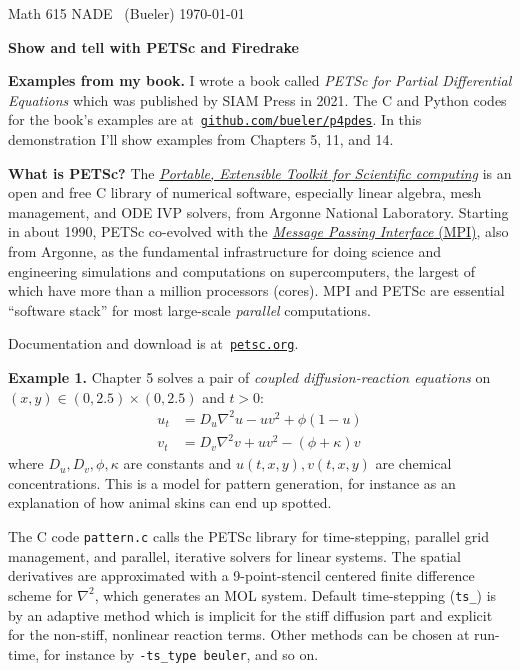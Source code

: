 \documentclass[12pt]{amsart}
\newcommand{\normalspacing}{\renewcommand{\baselinestretch}{1.05}
        \tiny\normalsize}
\newcommand{\grad}{\nabla}
\begin{document}
\scriptsize%
\noindent Math 615 NADE \, (Bueler) \hfill  \today
\normalsize\bigskip
\normalspacing

\Large\centerline{\textbf{Show and tell with \textbf{PETSc} and \textbf{Firedrake}}}
\normalsize

\bigskip
\thispagestyle{empty}
\normalspacing

\renewcommand{\labelenumi}{\arabic{enumi}.\,}


\bigskip
\noindent \textbf{Examples from my book.}  I wrote a book called \emph{PETSc for Partial Differential Equations} which was published by SIAM Press in 2021.  The C and Python codes for the book's examples are at \,\href{https://github.com/bueler/p4pdes}{\texttt{github.com/bueler/p4pdes}}.  In this demonstration I'll show examples from Chapters 5, 11, and 14.

\medskip
\noindent \textbf{What is PETSc?}  The \href{https://petsc.org/}{\emph{Portable, Extensible Toolkit for Scientific computing}} is an open and free C library of numerical software, especially linear algebra, mesh management, and ODE IVP solvers, from Argonne National Laboratory.  Starting in about 1990, PETSc co-evolved with the \href{https://www.mpich.org/}{\emph{Message Passing Interface} (MPI)}, also from Argonne, as the fundamental infrastructure for doing science and engineering simulations and computations on supercomputers, the largest of which have more than a million processors (cores).  MPI and PETSc are essential ``software stack'' for most large-scale \emph{parallel} computations.

Documentation and download is at \,\href{https://petsc.org/}{\texttt{petsc.org}}.

\bigskip
\noindent \textbf{Example 1.}  Chapter 5 solves a pair of \emph{coupled diffusion-reaction equations} on $(x,y) \in (0,2.5)\times (0,2.5)$ and $t>0$:
\begin{align*}
u_t &= D_u \grad^2 u - u v^2 + \phi (1 - u) \\
v_t &= D_v \grad^2 v + u v^2 - (\phi + \kappa) v
\end{align*}
where $D_u,D_v,\phi,\kappa$ are constants and $u(t,x,y),v(t,x,y)$ are chemical concentrations.  This is a model for pattern generation, for instance as an explanation of how animal skins can end up spotted.

The C code \texttt{pattern.c} calls the PETSc library for time-stepping, parallel grid management, and parallel, iterative solvers for linear systems.  The spatial derivatives are approximated with a 9-point-stencil centered finite difference scheme for $\nabla^2$, which generates an MOL system.  Default time-stepping (\texttt{ts\_}) is by an adaptive method which is implicit for the stiff diffusion part and explicit for the non-stiff, nonlinear reaction terms.  Other methods can be chosen at run-time, for instance by \texttt{-ts\_type beuler}, and so on.
\end{document}
